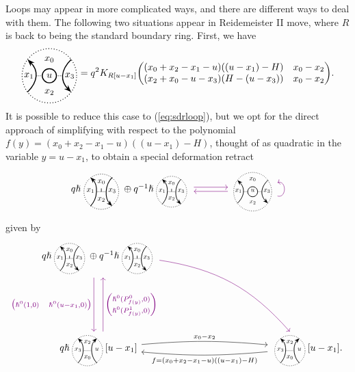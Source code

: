 \documentclass{article}
\newcommand{\vsdr}[5]{%
	\begin{tikzcd}[column sep=large, ampersand replacement=\&]
		{#1} 
		\arrow[r, "{#3}", shift left=0.5ex, color=violet] 
		\arrow[r, leftarrow, "{#4}", shift right=0.5ex, swap, color=violet] 
		\& #2 \arrow[loop right, distance=1em, in=15, out=-15, "{#5}",swap, color=violet]
	\end{tikzcd}%
}
\newcommand{\kmf}[2]{
	K_{#1}{\begin{pmatrix}
			#2
		\end{pmatrix}
	}	
}
\theoremstyle{plain} %
\theoremstyle{definition} %
\theoremstyle{remark} %
\begin{document}
Loops may appear in more complicated ways, and there are different ways to deal with them. The following two situations appear in Reidemeister II move, where $R$ is back to being the standard boundary ring. First, we have
\[
	\ThinThinUnoriented{u}{x_0}{x_1}{x_2}{x_3}
	=
	q^2 \kmf{R[u-x_1]}{(x_0+x_2-x_1-u)((u-x_1)-H) & x_0-x_2 \\							
								(x_2+x_0-u-x_3)(H-(u-x_3)) & x_0-x_2 }
	.
\]
It is possible to reduce this case to (\ref{eq:sdrloop}), but we opt for the direct approach of simplifying with respect to the polynomial $f(y)=(x_0+x_2-x_1-u)((u-x_1)-H)$, thought of as quadratic in the variable $y=u-x_1$, to obtain a special deformation retract
\begin{equation}\label{eq:sdrthinthin}
	\vsdr{q \hslash \scalebox{0.8}{\UnorientedHorizontalThinEdge{x_0}{x_1}{x_2}{x_3}{+}} \oplus q^{-1} \hslash 				\scalebox{0.7}{\UnorientedHorizontalThinEdge{x_0}{x_1}{x_2}{x_3}{+}}}
	{\scalebox{0.7}{\ThinThinUnoriented{u}{x_0}{x_1}{x_2}{x_3}}}
	{}{}{}
\end{equation}	
given by
\[
\begin{tikzcd}[column sep=4cm, row sep=2cm, ampersand replacement=\&]
	q \hslash \scalebox{0.7}{\UnorientedHorizontalThinEdge{x_0}{x_1}{x_2}{x_3}{+}} \oplus q^{-1} \hslash \scalebox{0.7}{\UnorientedHorizontalThinEdge{x_0}{x_1}{x_2}{x_3}{+}} 
	\arrow[d, shift right=2, "{\begin{pmatrix}\hslash^0(1,0) & \hslash^0(u-x_1,0) \end{pmatrix}}", swap, color=violet] 
	\arrow[dr, bend left=20, color=violet] 
	\&
	\\   
	q\hslash \scalebox{0.7}{\ThinEdge{x_2}{x_3}{x_0}{u}}[u-x_1] 
	\arrow[r, "x_0-x_2", bend left=5]
	\arrow[u, shift right=2, "{\begin{pmatrix} \hslash^0(P^0_{f(y)},0) \\ \hslash^0(P^1_{f(y)},0) \end{pmatrix}}",swap, color=violet]
	\& 
	\scalebox{0.7}{\ThinEdge{x_2}{x_3}{x_0}{u}}[u-x_1] 
	\arrow[l, "f=(x_0+x_2-x_1-u)((u-x_1)-H)", bend left=5] 
	.
\end{tikzcd}
\]
\end{document}
